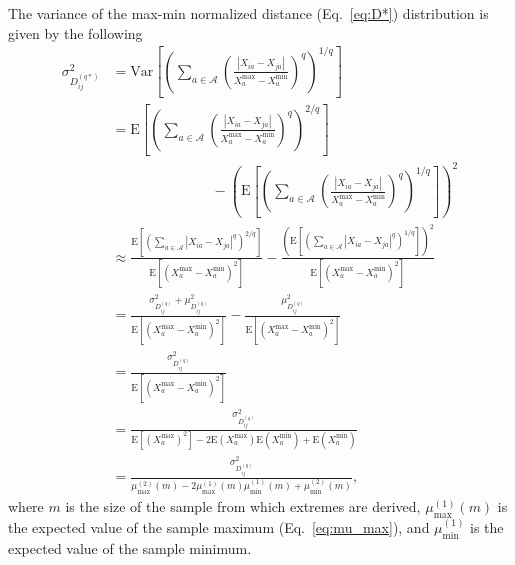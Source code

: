 \documentclass[aoas]{imsart}
\begin{document}
The variance of the max-min normalized distance (Eq.~\ref{eq:D*}) distribution is given by the following
%
\begin{equation}\label{eq:max-min_D_var}
\begin{aligned}
\sigma^2_{D^{(q*)}_{ij}} &= \text{Var}\left[\left(\sum_{a \in \mathcal{A}}\left(\frac{|X_{ia} - X_{ja}|}{X^\text{max}_a - X^\text{min}_a}\right)^q\right)^{1/q}\right] \\
&= \text{E}\left[\left(\sum_{a \in \mathcal{A}}\left(\frac{|X_{ia} - X_{ja}|}{X^\text{max}_a - X^\text{min}_a}\right)^q\right)^{2/q}\right] \\
&\hspace{3cm}- \left(\text{E}\left[\left(\sum_{a \in \mathcal{A}}\left(\frac{|X_{ia} - X_{ja}|}{X^\text{max}_a - X^\text{min}_a}\right)^q\right)^{1/q}\right]\right)^2 \\
&\approx \frac{\text{E}\left[\left(\displaystyle \sum_{a \in \mathcal{A}}|X_{ia} - X_{ja}|^q\right)^{2/q}\right]}{\text{E}[(X^\text{max}_a - X^\text{min}_a)^2]} - \frac{\left(\text{E}\left[\left(\displaystyle \sum_{a \in \mathcal{A}}|X_{ia} - X_{ja}|^q\right)^{1/q}\right]\right)^2}{\text{E}[(X^\text{max}_a - X^\text{min}_a)^2]} \\
&= \frac{\sigma^2_{D^{(q)}_{ij}} + \mu^2_{D^{(q)}_{ij}}}{\text{E}[(X^\text{max}_a - X^\text{min}_a)^2]} - \frac{\mu^2_{D^{(q)}_{ij}}}{\text{E}[(X^\text{max}_a - X^\text{min}_a)^2]} \\
&= \frac{\sigma^2_{D^{(q)}_{ij}}}{\text{E}[(X^\text{max}_a - X^\text{min}_a)^2]} \\
&= \frac{\sigma^2_{D^{(q)}_{ij}}}{\text{E}[(X^\text{max}_a)^2] - 2\text{E}(X^\text{max}_a)\text{E}(X^\text{min}_a) + \text{E}(X^\text{min}_a)} \\
&= \frac{\sigma^2_{D^{(q)}_{ij}}}{\mu^{(2)}_\text{max}(m) - 2\mu^{(1)}_\text{max}(m)\mu^{(1)}_\text{min}(m) + \mu^{(2)}_\text{min}(m)},
\end{aligned}
\end{equation}
%
where $m$ is the size of the sample from which extremes are derived, $\mu^{(1)}_\text{max}(m)$ is the expected value of the sample maximum (Eq.~\ref{eq:mu_max}), and $\mu^{(1)}_\text{min}$ is the expected value of the sample minimum.  
\end{document}
